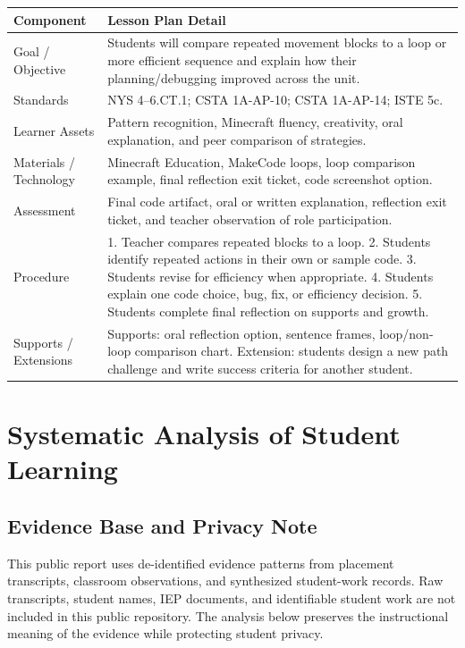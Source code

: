 \documentclass[12pt]{article}
\begin{document}
\begin{xltabular}{\textwidth}{|P{1.45in}|L|}
\hline
{}\color{white}\bfseries Component & \color{white}\bfseries Lesson Plan Detail \\
\hline
Goal / Objective & Students will compare repeated movement blocks to a loop or more efficient sequence and explain how their planning/debugging improved across the unit. \\
\hline
{} Standards & NYS 4--6.CT.1; CSTA 1A-AP-10; CSTA 1A-AP-14; ISTE 5c. \\
\hline
Learner Assets & Pattern recognition, Minecraft fluency, creativity, oral explanation, and peer comparison of strategies. \\
\hline
{} Materials / Technology & Minecraft Education, MakeCode loops, loop comparison example, final reflection exit ticket, code screenshot option. \\
\hline
Assessment & Final code artifact, oral or written explanation, reflection exit ticket, and teacher observation of role participation. \\
\hline
{} Procedure & 1. Teacher compares repeated blocks to a loop. 2. Students identify repeated actions in their own or sample code. 3. Students revise for efficiency when appropriate. 4. Students explain one code choice, bug, fix, or efficiency decision. 5. Students complete final reflection on supports and growth. \\
\hline
Supports / Extensions & Supports: oral reflection option, sentence frames, loop/non-loop comparison chart. Extension: students design a new path challenge and write success criteria for another student. \\
\hline
\end{xltabular}

\section{Systematic Analysis of Student Learning}

\subsection{Evidence Base and Privacy Note}

This public report uses de-identified evidence patterns from placement transcripts, classroom observations, and synthesized student-work records. Raw transcripts, student names, IEP documents, and identifiable student work are not included in this public repository. The analysis below preserves the instructional meaning of the evidence while protecting student privacy.
\end{document}
